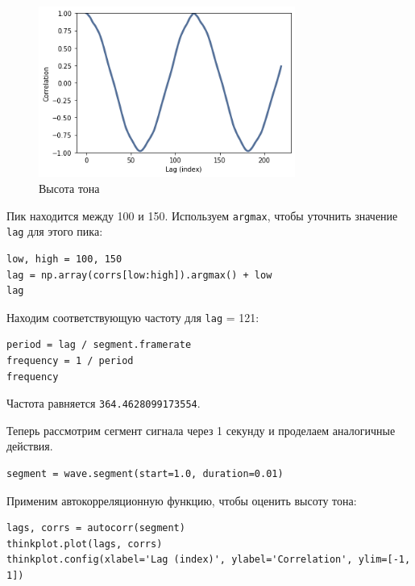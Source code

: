 \documentclass[a4paper,12pt]{report}
\begin{document}
\begin{figure}[H]
        \centering
        \includegraphics[width=0.75\textwidth]{lab5_fig1_1.png}
        \caption{Высота тона}
        \label{fig:lab5_fig1_1}
\end{figure}

Пик находится между 100 и 150. Используем \texttt{argmax}, чтобы уточнить значение \texttt{lag} для этого пика:

\begin{lstlisting}[caption=Нахождение \texttt{lag}]
low, high = 100, 150
lag = np.array(corrs[low:high]).argmax() + low
lag
\end{lstlisting}

Находим соответствующую частоту для \texttt{lag} = 121:

\begin{lstlisting}[caption=Нахождение частоты]
period = lag / segment.framerate
frequency = 1 / period
frequency
\end{lstlisting}

Частота равняется \texttt{364.4628099173554}.

Теперь рассмотрим сегмент сигнала через 1 секунду и проделаем аналогичные действия.

\begin{lstlisting}[caption=Второй сегмент]
segment = wave.segment(start=1.0, duration=0.01)
\end{lstlisting}

Применим автокорреляционную функцию, чтобы оценить высоту тона:

\begin{lstlisting}[caption=Оценка высоты тона]
lags, corrs = autocorr(segment)
thinkplot.plot(lags, corrs)
thinkplot.config(xlabel='Lag (index)', ylabel='Correlation', ylim=[-1, 1])
\end{lstlisting}
\end{document}

